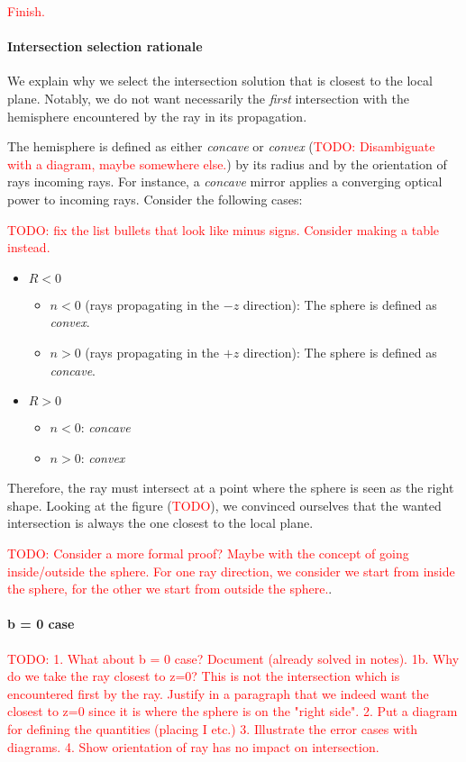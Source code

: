 \textcolor{red}{Finish.}

\paragraph{Intersection selection rationale}
We explain why we select the intersection solution that is closest to
the local plane. Notably, we do not want necessarily the \emph{first}
intersection with the hemisphere encountered by the ray in its propagation.

The hemisphere is defined as either \emph{concave} or \emph{convex}
(\textcolor{red}{TODO: Disambiguate with a diagram, maybe somewhere else.})
by its radius and by the orientation of rays incoming rays.
For instance, a \emph{concave} mirror applies a converging optical power
to incoming rays. Consider the following cases:

\textcolor{red}{TODO: fix the list bullets that look like minus signs.
Consider making a table instead.}

\begin{itemize}
\item $R<0$
\begin{itemize}
\item $n<0$ (rays propagating in the $-z$ direction): The sphere is defined
as \emph{convex}.
\item $n>0$ (rays propagating in the $+z$ direction): The sphere is defined
as \emph{concave}.
\end{itemize}
\item $R>0$
\begin{itemize}
\item $n<0$: \emph{concave}
\item $n>0$: \emph{convex}
\end{itemize} \end{itemize}

Therefore, the ray must intersect at a point where the sphere is seen
as the right shape. Looking at the figure (\textcolor{red}{TODO}), we
convinced ourselves that the wanted intersection is always the one
closest to the local plane.

\textcolor{red}{TODO: Consider a more formal proof? Maybe with the
concept of going inside/outside the sphere.
For one ray direction, we consider we start from inside the sphere,
for the other we start from outside the sphere.}.

\paragraph{b = 0 case}

\textcolor{red}{TODO:
1. What about b = 0 case? Document (already solved in notes).
1b. Why do we take the ray closest to z=0? This is not the
    intersection which is encountered first by the ray.
    Justify in a paragraph that we indeed want the closest to z=0
    since it is where the sphere is on the "right side".
2. Put a diagram for defining the quantities (placing I etc.)
3. Illustrate the error cases with diagrams.
4. Show orientation of ray has no impact on intersection.}

